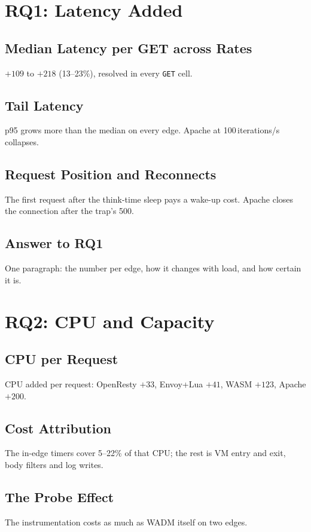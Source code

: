 \documentclass{rptuma}
\begin{document}
\chapter{RQ1: Latency Added}
\section{Median Latency per GET across Rates}
$+109$ to $+218$\us{} (13--23\%), resolved in every \texttt{GET} cell.
\section{Tail Latency}
p95 grows more than the median on every edge. Apache at 100\,iterations/s collapses.
\section{Request Position and Reconnects}
The first request after the think-time sleep pays a wake-up cost. Apache closes the connection
after the trap's 500.
\section{Answer to RQ1}
One paragraph: the number per edge, how it changes with load, and how certain it is.

\chapter{RQ2: CPU and Capacity}
\section{CPU per Request}
CPU added per request: OpenResty $+33$, Envoy+Lua $+41$, WASM $+123$, Apache $+200$\us.
\section{Cost Attribution}
The in-edge timers cover 5--22\% of that CPU; the rest is VM entry and exit, body filters and log
writes.
\section{The Probe Effect}
The instrumentation costs as much as WADM itself on two edges.
\end{document}
